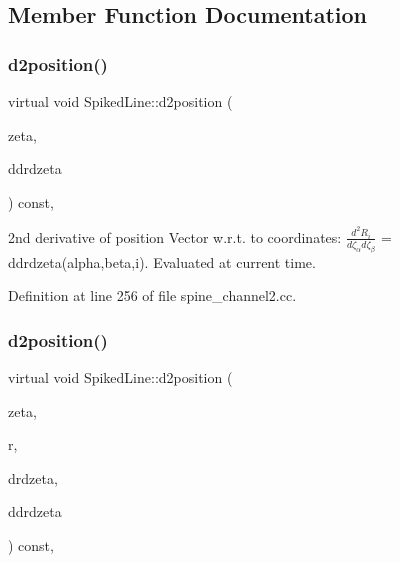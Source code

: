 \subsection{Member Function Documentation}
\mbox{\label{classSpikedLine_a5feeb76bcde12139b4fc5b8797ae033b}} 
\subsubsection{\texorpdfstring{d2position()}{d2position()}\hspace{0.1cm}{\footnotesize\ttfamily [1/2]}}
{\footnotesize\ttfamily virtual void Spiked\+Line\+::d2position (\begin{DoxyParamCaption}\item[{const Vector$<$ double $>$ \&}]{zeta,  }\item[{Rank\+Three\+Tensor$<$ double $>$ \&}]{ddrdzeta }\end{DoxyParamCaption}) const\hspace{0.3cm}{\ttfamily [inline]}, {\ttfamily [virtual]}}



2nd derivative of position Vector w.\+r.\+t. to coordinates\+: $ \frac{d^2R_i}{d \zeta_\alpha d \zeta_\beta}$ = ddrdzeta(alpha,beta,i). Evaluated at current time. 



Definition at line 256 of file spine\+\_\+channel2.\+cc.

\mbox{\label{classSpikedLine_a1f670bc6cc3aae65d209ecffb7a63ec2}} 
\subsubsection{\texorpdfstring{d2position()}{d2position()}\hspace{0.1cm}{\footnotesize\ttfamily [2/2]}}
{\footnotesize\ttfamily virtual void Spiked\+Line\+::d2position (\begin{DoxyParamCaption}\item[{const Vector$<$ double $>$ \&}]{zeta,  }\item[{Vector$<$ double $>$ \&}]{r,  }\item[{Dense\+Matrix$<$ double $>$ \&}]{drdzeta,  }\item[{Rank\+Three\+Tensor$<$ double $>$ \&}]{ddrdzeta }\end{DoxyParamCaption}) const\hspace{0.3cm}{\ttfamily [inline]}, {\ttfamily [virtual]}}



